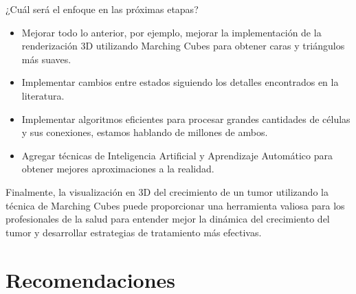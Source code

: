 \documentclass[a4paper,11pt]{article}
\begin{document}
{¿Cuál será el enfoque en las próximas etapas? 
\begin{itemize}
    \item Mejorar todo lo anterior, por ejemplo, mejorar la implementación de la renderización 3D utilizando Marching Cubes para obtener caras y triángulos más suaves.
    \item  Implementar cambios entre estados siguiendo los detalles encontrados en la literatura.
    \item Implementar algoritmos eficientes para procesar grandes cantidades de células y sus conexiones, estamos hablando de millones de ambos.
    \item Agregar técnicas de Inteligencia Artificial y Aprendizaje Automático para obtener mejores aproximaciones a la realidad.
\end{itemize}

Finalmente, la visualización en 3D del crecimiento de un tumor utilizando la técnica de Marching Cubes puede proporcionar una herramienta valiosa para los profesionales de la salud para entender mejor la dinámica del crecimiento del tumor y desarrollar estrategias de tratamiento más efectivas.


\section*{Recomendaciones}

}
\end{document}
